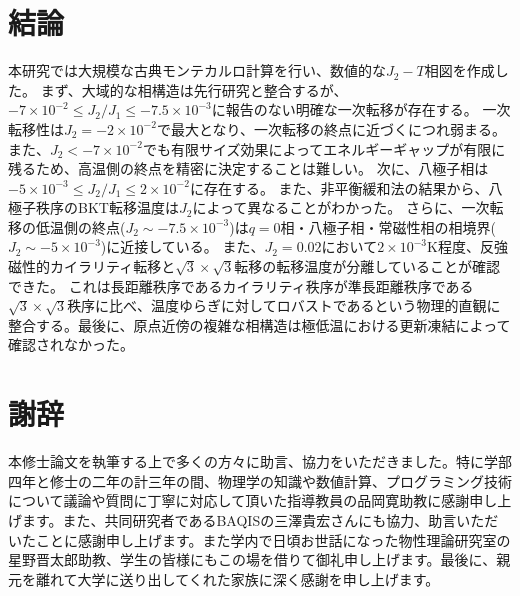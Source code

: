 \documentclass[12pt,titlepage,dvipdfmx]{jarticle}
\begin{document}
\section{結論}
本研究では大規模な古典モンテカルロ計算を行い、数値的な$J_2-T$相図を作成した。
まず、大域的な相構造は先行研究\cite{Korshunov2002}と整合するが、$-7\times10^{-2}\le J_2/J_1\le -7.5\times10^{-3}$に報告のない明確な一次転移が存在する。
一次転移性は$J_2=-2\times10^{-2}$で最大となり、一次転移の終点に近づくにつれ弱まる。
また、$J_2<-7\times10^{-2}$でも有限サイズ効果によってエネルギーギャップが有限に残るため、高温側の終点を精密に決定することは難しい。
次に、八極子相は$-5\times10^{-3}\le J_2/J_1\le2\times10^{-2}$に存在する。
また、非平衡緩和法の結果から、八極子秩序のBKT転移温度は$J_2$によって異なることがわかった。
さらに、一次転移の低温側の終点($J_2\sim-7.5\times10^{-3}$)は$q=0$相・八極子相・常磁性相の相境界($J_2\sim-5\times10^{-3}$)に近接している。
また、$J_2=0.02$において$2\times10^{-3}\si{\kelvin}$程度、反強磁性的カイラリティ転移と$\sqrt{3}\times\sqrt{3}$転移の転移温度が分離していることが確認できた。
これは長距離秩序であるカイラリティ秩序が準長距離秩序である$\sqrt{3}\times\sqrt{3}$秩序に比べ、温度ゆらぎに対してロバストであるという物理的直観に整合する。最後に、原点近傍の複雑な相構造は極低温における更新凍結によって確認されなかった。



\section{謝辞}
本修士論文を執筆する上で多くの方々に助言、協力をいただきました。特に学部四年と修士の二年の計三年の間、物理学の知識や数値計算、プログラミング技術について議論や質問に丁寧に対応して頂いた指導教員の品岡寛助教に感謝申し上げます。また、共同研究者であるBAQISの三澤貴宏さんにも協力、助言いただいたことに感謝申し上げます。また学内で日頃お世話になった物性理論研究室の星野晋太郎助教、学生の皆様にもこの場を借りて御礼申し上げます。最後に、親元を離れて大学に送り出してくれた家族に深く感謝を申し上げます。

\newpage



\end{document}
